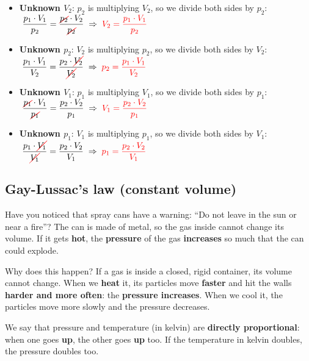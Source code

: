 \begin{itemize}
    \item \textbf{Unknown \(V_2\)}: \(p_2\) is multiplying \(V_2\), so we divide both sides by \(p_2\):
    \(\;\dfrac{p_1 \cdot V_1}{p_2} = \dfrac{\cancelred{p_2} \cdot V_2}{\cancelred{p_2}} \;\Rightarrow\; \textcolor{red}{V_2 = \dfrac{p_1 \cdot V_1}{p_2}}\)
    \item \textbf{Unknown \(p_2\)}: \(V_2\) is multiplying \(p_2\), so we divide both sides by \(V_2\):
    \(\;\dfrac{p_1 \cdot V_1}{V_2} = \dfrac{p_2 \cdot \cancelred{V_2}}{\cancelred{V_2}} \;\Rightarrow\; \textcolor{red}{p_2 = \dfrac{p_1 \cdot V_1}{V_2}}\)
    \item \textbf{Unknown \(V_1\)}: \(p_1\) is multiplying \(V_1\), so we divide both sides by \(p_1\):
    \(\;\dfrac{\cancelred{p_1} \cdot V_1}{\cancelred{p_1}} = \dfrac{p_2 \cdot V_2}{p_1} \;\Rightarrow\; \textcolor{red}{V_1 = \dfrac{p_2 \cdot V_2}{p_1}}\)
    \item \textbf{Unknown \(p_1\)}: \(V_1\) is multiplying \(p_1\), so we divide both sides by \(V_1\):
    \(\;\dfrac{p_1 \cdot \cancelred{V_1}}{\cancelred{V_1}} = \dfrac{p_2 \cdot V_2}{V_1} \;\Rightarrow\; \textcolor{red}{p_1 = \dfrac{p_2 \cdot V_2}{V_1}}\)
\end{itemize}


\subsection{Gay-Lussac's law (constant volume)}

 Have you noticed that spray cans have a warning: ``Do not leave in the sun or near a fire''? The can is made of metal, so the gas inside cannot change its volume. If it gets \textbf{hot}, the \textbf{pressure} of the gas \textbf{increases} so much that the can could explode.

Why does this happen? If a gas is inside a closed, rigid container, its volume cannot change. When we \textbf{heat} it, its particles move \textbf{faster} and hit the walls \textbf{harder and more often}: the \textbf{pressure increases}. When we cool it, the particles move more slowly and the pressure decreases.

We say that pressure and temperature (in kelvin) are \textbf{directly proportional}: when one goes \textbf{up}, the other goes \textbf{up} too. If the temperature in kelvin doubles, the pressure doubles too.

